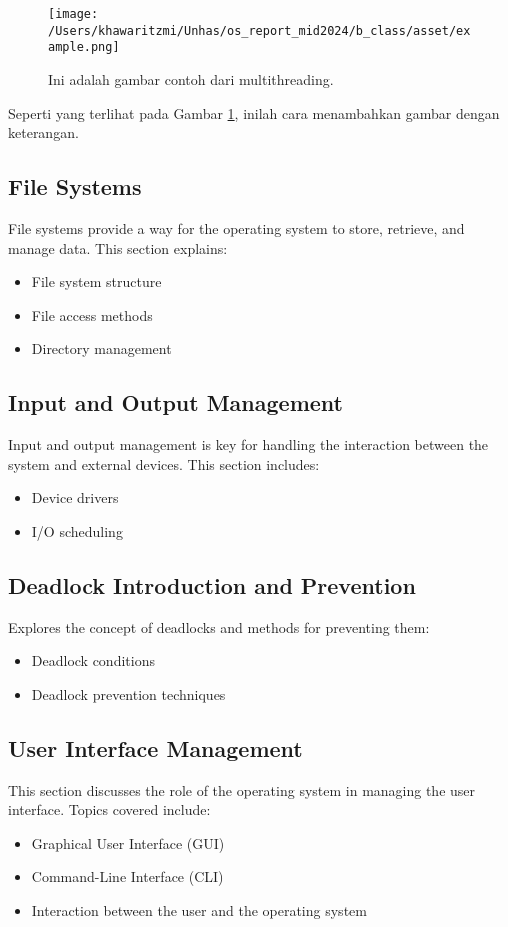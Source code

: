 \documentclass[12pt]{article}
\begin{document}
\begin{itemize}
\begin{figure}[h]
    \centering
    \texttt{[image: /Users/khawaritzmi/Unhas/os\_report\_mid2024/b\_class/asset/example.png]}  %
    \caption{Ini adalah gambar contoh dari multithreading.}
    \label{fig:contoh_gambar}
\end{figure}

Seperti yang terlihat pada Gambar \ref{fig:contoh_gambar}, inilah cara menambahkan gambar dengan keterangan.

\subsection{File Systems}
File systems provide a way for the operating system to store, retrieve, and manage data. This section explains:
\begin{itemize}
    \item File system structure
    \item File access methods
    \item Directory management
\end{itemize}

\subsection{Input and Output Management}
Input and output management is key for handling the interaction between the system and external devices. This section includes:
\begin{itemize}
    \item Device drivers
    \item I/O scheduling
\end{itemize}

\subsection{Deadlock Introduction and Prevention}
Explores the concept of deadlocks and methods for preventing them:
\begin{itemize}
    \item Deadlock conditions
    \item Deadlock prevention techniques
\end{itemize}

\subsection{User Interface Management}
This section discusses the role of the operating system in managing the user interface. Topics covered include:
\begin{itemize}
    \item Graphical User Interface (GUI)
    \item Command-Line Interface (CLI)
    \item Interaction between the user and the operating system
\end{itemize}


\end{itemize}
\end{document}

